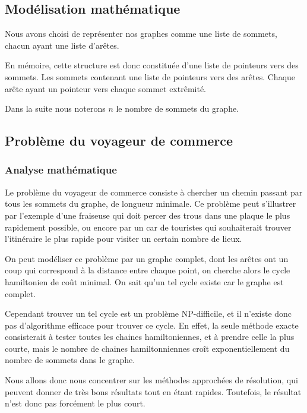 \subsection{Modélisation mathématique}

  Nous avons choisi de représenter nos graphes comme une liste de sommets,
  chacun ayant une liste d'arêtes.

  En mémoire, cette structure est donc constituée d'une liste de pointeurs
  vers des sommets. Les sommets contenant une liste de pointeurs vers des
  arêtes. Chaque arête ayant un pointeur vers chaque sommet extrêmité.

  Dans la suite nous noterons $n$ le nombre de sommets du graphe.

\subsection{Problème du voyageur de commerce}

\subsubsection{Analyse mathématique}
    Le problème du voyageur de commerce consiste à chercher un chemin passant
    par tous les sommets du graphe, de longueur minimale.
    Ce problème peut s'illustrer par l'exemple d'une
    fraiseuse qui doit percer des trous dans une plaque le plus
    rapidement possible, ou encore par un car de touristes qui souhaiterait
    trouver l'itinéraire le plus rapide pour visiter un certain nombre de lieux.

    On peut modéliser ce problème par un graphe complet, dont les arêtes ont un
    coup qui correspond à la distance entre chaque point, on cherche alors le
    cycle hamiltonien de coût minimal. On sait qu'un tel cycle existe car le
    graphe est complet.

    Cependant trouver un tel cycle est un problème NP-difficile, et il n'existe
    donc pas d'algorithme efficace pour trouver ce cycle.
    En effet, la seule méthode exacte consisterait à tester toutes les chaines
    hamiltoniennes, et à prendre celle la plus courte, mais le nombre de chaines
    hamiltonniennes croît exponentiellement du nombre de sommets dans le graphe.

    Nous allons donc nous concentrer sur les méthodes approchées de résolution,
    qui peuvent donner de très bons résultats tout en étant rapides.
    Toutefois, le résultat n'est donc pas forcément le plus court.

